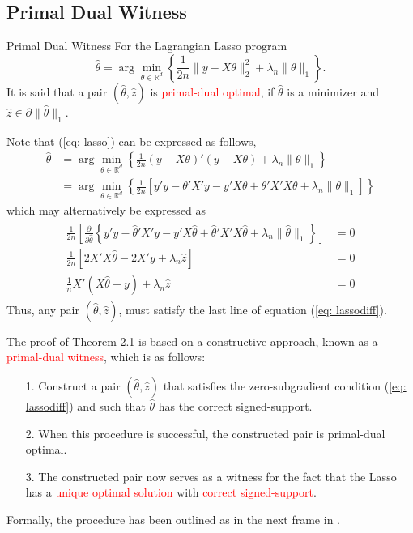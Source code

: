 \documentclass[10pt,handout,english]{beamer}
\newcommand{\R}{\mathbb{R}}
\begin{document}
\subsection{Primal Dual Witness}
\begin{frame}[allowframebreaks]{Primal Dual Witness}
For the Lagrangian Lasso program
\begin{equation}\label{eq: lasso}
\hat{\theta}=\arg\min_{\theta\in\R^d}\left\{\frac{1}{2n}\lVert y-X\theta\rVert_2^2+\lambda_n\lVert\theta\rVert_1\right\}.
\end{equation}
It is said that a pair $(\hat{\theta},\hat{z})$ is \textcolor{red}{primal-dual optimal}, if $\hat{\theta}$ is a minimizer and $\hat{z}\in\partial\lVert\hat{\theta}\rVert_1$.

Note that (\ref{eq: lasso}) can be expressed as follows,
\begin{align*}
\hat{\theta}&=\arg\min_{\theta\in\R^d}\left\{\frac{1}{2n} (y-X\theta)'(y-X\theta)+\lambda_n\lVert\theta\rVert_1\right\}\\
&=\arg\min_{\theta\in\R^d}\left\{\frac{1}{2n}\left[ y'y-\theta' X'y-y'X\theta+\theta'X'X\theta+\lambda_n\lVert\theta\rVert_1\right]\right\}
\end{align*}
which may alternatively be expressed as 
\begin{align}
\begin{split}
\frac{1}{2n}\left[\frac{\partial}{\partial\hat{\theta}}\left\{y'y-\hat{\theta}' X'y-y'X\hat{\theta}+\hat{\theta}'X'X\hat{\theta}+\lambda_n\lVert\hat{\theta}\rVert_1\right\}\right]&=0\\
\frac{1}{2n}\left[2X'X\hat{\theta}-2X'y+\lambda_n \hat{z}\right]&=0\\
\frac{1}{n}X'\left(X\hat{\theta}-y\right)+\lambda_n\hat{z}&=0\label{eq: lassodiff}
\end{split}
\end{align}
Thus, any pair $(\hat{\theta},\hat{z})$, must satisfy the last line of equation (\ref{eq: lassodiff}).
\end{frame}
\begin{frame}[allowframebreaks]
The proof of Theorem 2.1 is based on a constructive approach, known as a \textcolor{red}{primal-dual witness}, which is as follows:
\begin{itemize}
\item[1.] Construct a pair $(\hat{\theta},\hat{z})$ that satisfies the zero-subgradient condition (\ref{eq: lassodiff}) and such that $\hat{\theta}$ has the correct signed-support.\justifying
\item[2.] When this procedure is successful, the constructed pair is primal-dual optimal.\justifying
\item[3.] The constructed pair now serves as a witness for the fact that the Lasso has a \textcolor{red}{unique optimal solution} with \textcolor{red}{correct signed-support}.\justifying 
\end{itemize} 
Formally, the procedure has been outlined as in the next frame in \citet{wainwright2019high}.
\end{frame}
\end{document}
